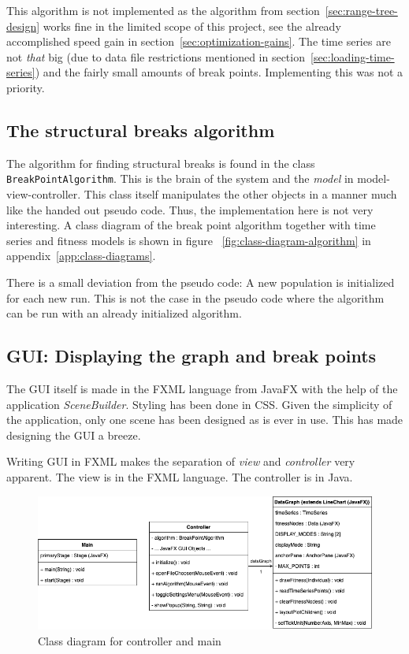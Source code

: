 This algorithm is not implemented as the algorithm from
section~\ref{sec:range-tree-design} works fine in the limited scope of this
project, see the already accomplished speed gain in
section~\ref{sec:optimization-gains}. The time series are not \textit{that} big
(due to data file restrictions mentioned in
section~\ref{sec:loading-time-series}) and the fairly small amounts of break
points. Implementing this was not a priority. 



\subsection{The structural breaks algorithm}

The algorithm for finding structural breaks is found in the class
\texttt{BreakPointAlgorithm}. This is the brain of the system and the
\textit{model} in model-view-controller. This class itself manipulates the other
objects in a manner much like the handed out pseudo code. Thus, the
implementation here is not very interesting. A class diagram of the break point
algorithm together with time series and fitness models is shown in figure
~\ref{fig:class-diagram-algorithm} in appendix~\ref{app:class-diagrams}.

There is a small deviation from the pseudo code: A new population is initialized
for each new run. This is not the case in the pseudo code where the algorithm
can be run with an already initialized algorithm. 


\subsection{GUI: Displaying the graph and break points}
\label{sec:graph-implementation}

The GUI itself is made in the FXML language from JavaFX with the help of the
application \textit{SceneBuilder}. Styling has been done in CSS. Given the simplicity of the application, only one
scene has been designed as is ever in use. This has made 
designing the GUI a breeze. 

Writing GUI in FXML makes the separation of \textit{view} and
\textit{controller} very apparent. The view is in the FXML language. The
controller is in Java. 

\begin{figure}[ht]
    \centering
    \includegraphics[width=.8\textwidth]{fig/class-diagram-controller.png}
    \caption{Class diagram for controller and main}
    \label{fig:class-diagram-controller}
\end{figure}


